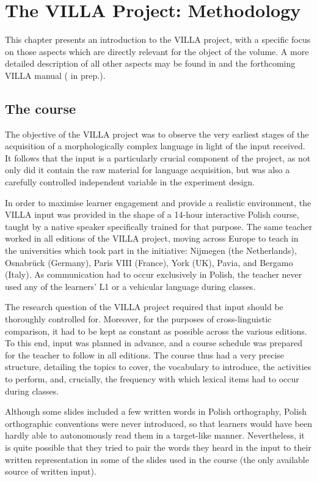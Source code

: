\chapter{The VILLA Project: Methodology}\label{sec:2}

This chapter presents an introduction to the VILLA project, with a specific focus on those aspects which are directly relevant for the object of the volume. A more detailed description of all other aspects may be found in \citet{DimrothEtAl2013} and the forthcoming VILLA manual (\citeauthor{WatorekEtAlND} in prep.).

\section{The course}\label{sec:02:1}

The objective of the VILLA project was to observe the very earliest stages of the acquisition of a morphologically complex language in light of the input received. It follows that the input is a particularly crucial component of the project, as not only did it contain the raw material for language acquisition, but was also a carefully controlled independent variable in the experiment design. 

In order to maximise learner engagement and provide a realistic environment, the VILLA input was provided in the shape of a 14-hour interactive Polish course, taught by a native speaker specifically trained for that purpose. The same teacher worked in all editions of the VILLA project, moving across Europe to teach in the universities which took part in the initiative: Nijmegen (the Netherlands), Osnabrück (Germany), Paris VIII (France), York (UK), Pavia, and Bergamo (Italy). As communication had to occur exclusively in Polish, the teacher never used any of the learners' L1 or a vehicular language during classes.

The research question of the VILLA project required that input should be thoroughly controlled for. Moreover, for the purposes of cross-linguistic comparison, it had to be kept as constant as possible across the various editions. To this end, input was planned in advance, and a course schedule was prepared for the teacher to follow in all editions. The course thus had a very precise structure, detailing the topics to cover, the vocabulary to introduce, the activities to perform, and, crucially, the frequency with which lexical items had to occur during classes. 

Although some slides included a few written words in Polish orthography, Polish orthographic conventions were never introduced, so that learners would have been hardly able to autonomously read them in a target-like manner. Nevertheless, it is quite possible that they tried to pair the words they heard in the input to their written representation in some of the slides used in the course (the only available source of written input).

